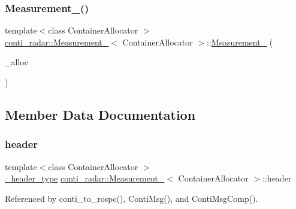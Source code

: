 \subsubsection{\texorpdfstring{Measurement\+\_\+()}{Measurement\_()}\hspace{0.1cm}{\footnotesize\ttfamily [2/2]}}
{\footnotesize\ttfamily template$<$class Container\+Allocator $>$ \\
\hyperlink{structconti__radar_1_1Measurement__}{conti\+\_\+radar\+::\+Measurement\+\_\+}$<$ Container\+Allocator $>$\+::\hyperlink{structconti__radar_1_1Measurement__}{Measurement\+\_\+} (\begin{DoxyParamCaption}\item[{const Container\+Allocator \&}]{\+\_\+alloc }\end{DoxyParamCaption})\hspace{0.3cm}{\ttfamily [inline]}}



\subsection{Member Data Documentation}
\mbox{\label{structconti__radar_1_1Measurement___afc62e4e451ea07e5726031459b10eda3}} 
\subsubsection{\texorpdfstring{header}{header}}
{\footnotesize\ttfamily template$<$class Container\+Allocator $>$ \\
\hyperlink{structconti__radar_1_1Measurement___af08d17198291be87e84f45ef07e9155f}{\+\_\+header\+\_\+type} \hyperlink{structconti__radar_1_1Measurement__}{conti\+\_\+radar\+::\+Measurement\+\_\+}$<$ Container\+Allocator $>$\+::header}



Referenced by conti\+\_\+to\+\_\+rospc(), Conti\+Msg(), and Conti\+Msg\+Comp().

\mbox{\label{structconti__radar_1_1Measurement___a0a5cb134f81aef2032a39639e493ed25}} 

